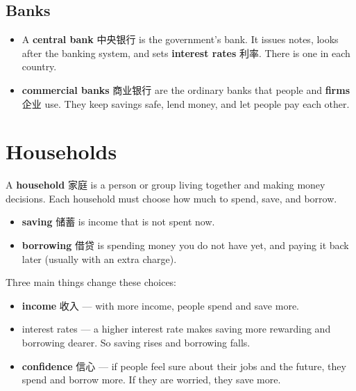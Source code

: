 \documentclass[11pt]{article}
\begin{document}
\subsection*{Banks}

\begin{itemize}
\item A \textbf{central bank} 中央银行 is the government's bank. It issues notes, looks after the banking system, and sets \textbf{interest rates} 利率. There is one in each country.

\item \textbf{commercial banks} 商业银行 are the ordinary banks that people and \textbf{firms} 企业 use. They keep savings safe, lend money, and let people pay each other.

\end{itemize}

\section*{Households}

A \textbf{household} 家庭 is a person or group living together and making money decisions. Each household must choose how much to spend, save, and borrow.

\begin{itemize}
\item \textbf{saving} 储蓄 is income that is not spent now.

\item \textbf{borrowing} 借贷 is spending money you do not have yet, and paying it back later (usually with an extra charge).

\end{itemize}

Three main things change these choices:

\begin{itemize}
\item \textbf{income} 收入 — with more income, people spend and save more.

\item interest rates — a higher interest rate makes saving more rewarding and borrowing dearer. So saving rises and borrowing falls.

\item \textbf{confidence} 信心 — if people feel sure about their jobs and the future, they spend and borrow more. If they are worried, they save more.

\end{itemize}
\end{document}
